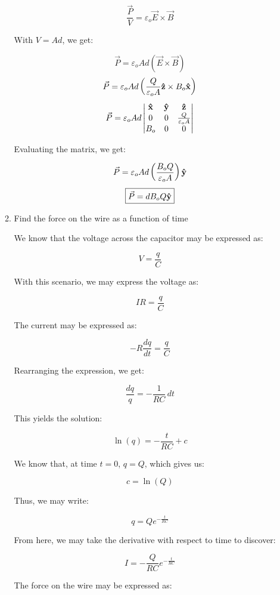 \begin{enumerate}
\begin{enumerate}
        $$\frac{\vec{P}}{V}=\varepsilon_o\vec{E}\times\vec{B}$$

        With $V=Ad$, we get:

        $$\vec{P}=\varepsilon_oAd\left(\vec{E}\times\vec{B}\right)$$
        $$\vec{P}=\varepsilon_oAd\left(\frac{Q}{\varepsilon_o A}\bold{\hat{z}}\times B_o\bold{\hat{x}}\right)$$
        $$\vec{P}=\varepsilon_oAd\left|\begin{matrix} \bold{\hat{x}} & \bold{\hat{y}} & \bold{\hat{z}}\\ 0 & 0 & \frac{Q}{\varepsilon_o A}\\ B_o & 0 & 0\\ \end{matrix}\right|$$

        Evaluating the matrix, we get:

        $$\vec{P}=\varepsilon_oAd\left( \frac{B_oQ}{\varepsilon_o A} \right)\bold{\hat{y}}$$
        $$\boxed{\vec{P}=dB_oQ\bold{\hat{y}}}$$

      \item Find the force on the wire as a function of time

        We know that the voltage across the capacitor may be expressed as:

        $$V=\frac{q}{C}$$

        With this scenario, we may express the voltage as:

        $$IR=\frac{q}{C}$$

        The current may be expressed as:

        $$-R\frac{dq}{dt}=\frac{q}{C}$$

        Rearranging the expression, we get:

        $$\frac{dq}{q}=-\frac{1}{RC}\,dt$$

        This yields the solution:

        $$\ln(q)=-\frac{t}{RC}+c$$

        We know that, at time $t=0$, $q=Q$, which gives us:

        $$c=\ln(Q)$$

        Thus, we may write:

        $$q=Qe^{-\frac{t}{RC}}$$

        From here, we may take the derivative with respect to time to discover:

        $$I=-\frac{Q}{RC}e^{-\frac{t}{RC}}$$

        The force on the wire may be expressed as:


\end{enumerate}
\end{enumerate}
